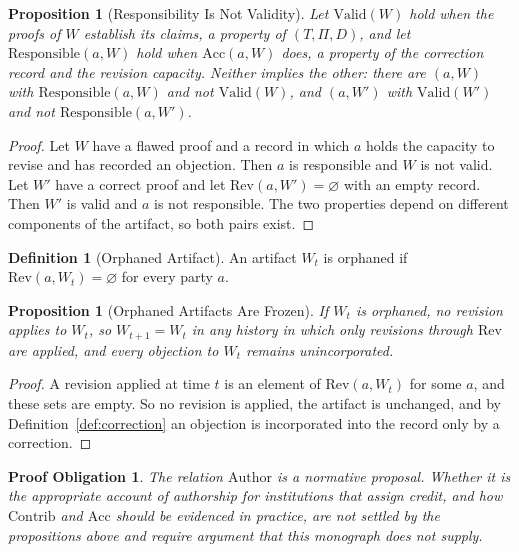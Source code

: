 \documentclass[11pt,letterpaper]{report}
\theoremstyle{plain}
\newtheorem{proposition}[theorem]{Proposition}
\newtheorem{obligation}[theorem]{Proof Obligation}
\theoremstyle{definition}
\newtheorem{definition}[theorem]{Definition}
\theoremstyle{remark}
\begin{document}
\begin{proposition}[Responsibility Is Not Validity]\label{pr:respvalid}
Let $\mathrm{Valid}(W)$ hold when the proofs of $W$ establish its claims, a property of $(T,\Pi,D)$, and let $\mathrm{Responsible}(a,W)$ hold when $\mathrm{Acc}(a,W)$ does, a property of the correction record and the revision capacity. Neither implies the other: there are $(a,W)$ with $\mathrm{Responsible}(a,W)$ and not $\mathrm{Valid}(W)$, and $(a,W')$ with $\mathrm{Valid}(W')$ and not $\mathrm{Responsible}(a,W')$.
\end{proposition}
\begin{proof}
Let $W$ have a flawed proof and a record in which $a$ holds the capacity to revise and has recorded an objection. Then $a$ is responsible and $W$ is not valid. Let $W'$ have a correct proof and let $\mathrm{Rev}(a,W')=\varnothing$ with an empty record. Then $W'$ is valid and $a$ is not responsible. The two properties depend on different components of the artifact, so both pairs exist.
\end{proof}

\begin{definition}[Orphaned Artifact]
An artifact $W_t$ is orphaned if $\mathrm{Rev}(a,W_t)=\varnothing$ for every party $a$.
\end{definition}

\begin{proposition}[Orphaned Artifacts Are Frozen]\label{pr:orphan}
If $W_t$ is orphaned, no revision applies to $W_t$, so $W_{t+1}=W_t$ in any history in which only revisions through $\mathrm{Rev}$ are applied, and every objection to $W_t$ remains unincorporated.
\end{proposition}
\begin{proof}
A revision applied at time $t$ is an element of $\mathrm{Rev}(a,W_t)$ for some $a$, and these sets are empty. So no revision is applied, the artifact is unchanged, and by Definition~\ref{def:correction} an objection is incorporated into the record only by a correction.
\end{proof}

\begin{obligation}\label{ob:authorship}
The relation $\mathrm{Author}$ is a normative proposal. Whether it is the appropriate account of authorship for institutions that assign credit, and how $\mathrm{Contrib}$ and $\mathrm{Acc}$ should be evidenced in practice, are not settled by the propositions above and require argument that this monograph does not supply.
\end{obligation}
\end{document}
